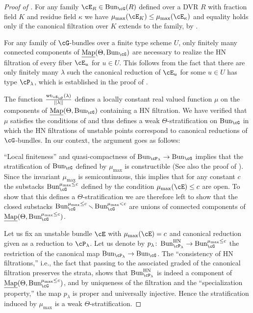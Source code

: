 \documentclass[a4paper]{amsart}
\numberwithin{equation}{section}
\theoremstyle{plain}
\theoremstyle{definition}
\DeclareMathOperator{\Bun}{Bun}
\newcommand{\uMap}{\underline{{\rm Map}}}
\newcommand{\co}{\colon}
\DeclareMathOperator{\HN}{HN}
\DeclareMathOperator{\wt}{wt}
\begin{document}
\begin{proof}[Proof of ]
\medskip
{}
\medskip

For any family $\cE_R \in \Bun_{\cG}(R)$ defined over a DVR $R$ with fraction field $K$ and residue field $\kappa$ we have $\mu_{\max}(\cE_K)\leq \mu_{\max}(\cE_\kappa)$ and equality holds only if the canonical filtration over $K$ extends to the family, by \cite[Lem.~3.17]{heinloth-stability}.

\medskip
{}
\medskip

For any family of $\cG$-bundles over a finite type scheme $U$, only finitely many connected components of $\uMap(\Theta,\Bun_\cG)$ are necessary to realize the HN filtration of every fiber $\cE_u$ for $u \in U$. This follows from the fact that there are only finitely many $\lambda$ such the canonical reduction of $\cE_u$ for some $u \in U$ has type $\cP_\lambda$, which is established in the proof of \cite[Prop.~3.18]{heinloth-stability}.

\medskip
{}
\medskip

The function $\frac{\wt_{\cE_\cP}(\lambda)}{||\lambda||}$ defines a locally constant real valued function $\mu$ on the components of $\uMap(\Theta,\Bun_\cG)$ containing a HN filtration. We have verified that $\mu$ satisfies the conditions of \cite[Thm.~2.2.2, Simplif.~2.2.3, Simplif.~2.2.4]{hlinstability} and thus defines a weak $\Theta$-stratification on $\Bun_\cG$ in which the HN filtrations of unstable points correspond to canonical reductions of $\cG$-bundles. In our context, the argument goes as follows:

``Local finiteness'' and quasi-compactness of $\Bun_{\cP_\lambda} \to \Bun_\cG$ implies that the stratification of $\Bun_{\cG}$ defined by $\mu_{\max}$ is constructible (See also the proof of \cite[Prop.~3.18]{heinloth-stability}). Since the invariant $\mu_{\max}$ is semicontinuous, this implies that for any constant $c$ the substacks $\Bun_{\cG}^{\mu_{\max}\leq c}$ defined by the condition $\mu_{\max}(\cE)\leq c$ are open. To show that this defines a $\Theta$-stratification we are therefore left to show that the closed substacks $\Bun_{\cG}^{\mu_{\max}\leq c}\smallsetminus \Bun_{\cG}^{\mu_{\max}<c}$ are unions of connected components of $\uMap(\Theta,\Bun_{\cG}^{\mu_{\max}\leq c})$.
	
Let us fix an unstable bundle $\cE$ with $\mu_{\max}(\cE)=c$ and canonical reduction given as a reduction to $\cP_\lambda$. Let us denote by $p_\lambda\co \Bun_{\cP_\lambda}^{\HN} \to \Bun_{\cG}^{\mu_{\max}\leq c}$ the restriction of the canonical map $\Bun_{\cP_\lambda} \to \Bun_{\cG}$. The ``consistency of HN filtrations,'' i.e., the fact that passing to the associated graded of the canonical filtration preserves the strata, shows that $\Bun_{\cP_\lambda}^{\HN}$ is indeed a component of $\uMap(\Theta,\Bun_{\cG}^{\mu_{\max}\leq c})$, and by uniqueness of the filtration and the ``specialization property,'' the map $p_\lambda$ is proper and universally injective. Hence the stratification induced by $\mu_{\max}$ is a weak $\Theta$-stratification.


\end{proof}
\end{document}
